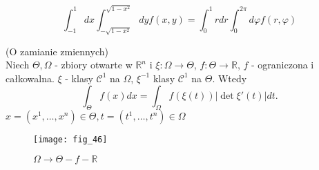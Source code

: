 \documentclass[../main.tex]{subfiles}
\begin{document}
    \begin{equation}
        \int_{-1}^{1}dx\int_{-\sqrt{1-x^2} }^{\sqrt{1-x^2} }dy f(x,y) = \int_0^1 r dr \int_0^{2\pi} d\varphi f(r,\varphi)
    \end{equation}
    \begin{tw}
        (O zamianie zmiennych)\\
        Niech $\Theta, \Omega$ - zbiory otwarte w $\mathbb{R}^n$ i $\xi: \Omega\to \Theta$, $f: \Theta\to \mathbb{R}$, $f$ - ograniczona i całkowalna. $\xi$ - klasy $\mathcal{C}^1$ na $\Omega$, $\xi^{-1}$ klasy $\mathcal{C}^{1}$ na $\Theta$. Wtedy
        \begin{equation}
            \int_{\Theta} f(x) dx =  \int_{\Omega} f(\xi(t)) | \det \xi'(t) | dt.
        \end{equation}
        $x=(x^1,\ldots,x^n)\in \Theta, t=(t^1,\ldots,t^n)\in \Omega$
    \end{tw}
    \begin{figure}[h]
        \centering
        \texttt{[image: fig\_46]}
        \caption{$\Omega\to\Theta - f - \mathbb{R}$}
    \end{figure}
\end{document}
